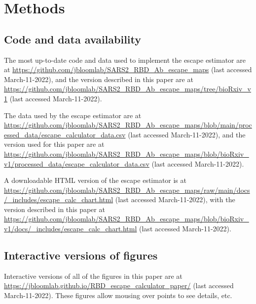 \documentclass[9pt,twocolumn,twoside]{gsajnl_modified}
\begin{document}
{\small

\section{Methods}
\subsection{Code and data availability}
The most up-to-date code and data used to implement the escape estimator are at \url{https://github.com/jbloomlab/SARS2_RBD_Ab_escape_maps} (last accessed March-11-2022), and the version described in this paper are at \url{https://github.com/jbloomlab/SARS2_RBD_Ab_escape_maps/tree/bioRxiv_v1} (last accessed March-11-2022).

The data used by the escape estimator are at \url{https://github.com/jbloomlab/SARS2_RBD_Ab_escape_maps/blob/main/processed_data/escape_calculator_data.csv} (last accessed March-11-2022), and the version used for this paper are at \url{https://github.com/jbloomlab/SARS2_RBD_Ab_escape_maps/blob/bioRxiv_v1/processed_data/escape_calculator_data.csv} (last accessed March-11-2022).

A downloadable HTML version of the escape estimator is at \url{https://github.com/jbloomlab/SARS2_RBD_Ab_escape_maps/raw/main/docs/_includes/escape_calc_chart.html} (last accessed March-11-2022), with the version described in this paper at \url{https://github.com/jbloomlab/SARS2_RBD_Ab_escape_maps/blob/bioRxiv_v1/docs/_includes/escape_calc_chart.html} (last accessed March-11-2022).

\subsection{Interactive versions of figures}
Interactive versions of all of the figures in this paper are at \url{https://jbloomlab.github.io/RBD_escape_calculator_paper/} (last accessed March-11-2022).
These figures allow mousing over points to see details, etc.

}
\end{document}
